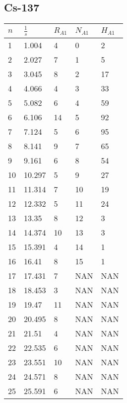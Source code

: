 \documentclass{article}
\begin{document}
		\subsection*{Cs-137}
			\begin{longtable}{@{}lllll@{}}
				\toprule
				$n$   & $\frac{1}{s}$     & $R_{A1}$ & $N_{A1}$ & $H_{A1}$ \\* \midrule
				\endfirsthead
				\endhead
				\bottomrule
				\endfoot
				\endlastfoot
				1   & 1.004   & 4     & 0     & 2     \\
				2   & 2.027   & 7     & 1     & 5     \\
				3   & 3.045   & 8     & 2     & 17    \\
				4   & 4.066   & 4     & 3     & 33    \\
				5   & 5.082   & 6     & 4     & 59    \\
				6   & 6.106   & 14    & 5     & 92    \\
				7   & 7.124   & 5     & 6     & 95    \\
				8   & 8.141   & 9     & 7     & 65    \\
				9   & 9.161   & 6     & 8     & 54    \\
				10  & 10.297  & 5     & 9     & 27    \\
				11  & 11.314  & 7     & 10    & 19    \\
				12  & 12.332  & 5     & 11    & 24    \\
				13  & 13.35   & 8     & 12    & 3     \\
				14  & 14.374  & 10    & 13    & 3     \\
				15  & 15.391  & 4     & 14    & 1     \\
				16  & 16.41   & 8     & 15    & 1     \\
				17  & 17.431  & 7     & NAN   & NAN   \\
				18  & 18.453  & 3     & NAN   & NAN   \\
				19  & 19.47   & 11    & NAN   & NAN   \\
				20  & 20.495  & 8     & NAN   & NAN   \\
				21  & 21.51   & 4     & NAN   & NAN   \\
				22  & 22.535  & 6     & NAN   & NAN   \\
				23  & 23.551  & 10    & NAN   & NAN   \\
				24  & 24.571  & 8     & NAN   & NAN   \\
				25  & 25.591  & 6     & NAN   & NAN   \\

\end{longtable}
\end{document}
